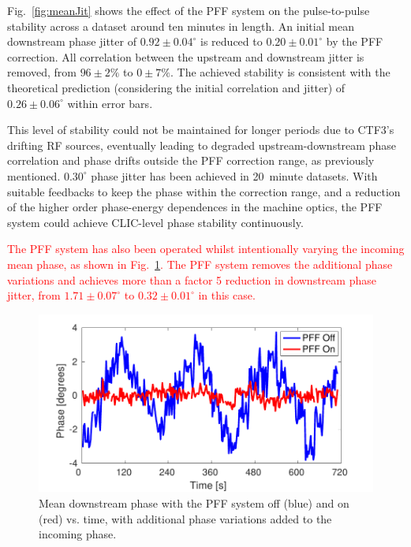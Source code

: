 \documentclass[%
 reprint,
superscriptaddress,
 amsmath,amssymb,
 prl,
]{revtex4-1}
\begin{document}
Fig.~\ref{fig:meanJit} shows the effect of the PFF system on the pulse-to-pulse 
stability across a dataset around ten minutes in length. An 
initial mean downstream phase jitter of \(0.92\pm0.04^\circ\) is reduced to \(0.20\pm0.01^\circ\) by the PFF 
correction. All correlation between the upstream and downstream jitter is removed, from 
\(96\pm2\%\) to \(0\pm7\%\). The achieved stability is consistent with the theoretical prediction (considering the initial correlation and jitter) of \(0.26\pm0.06^\circ\) within error bars.

This level of stability could not be maintained for longer periods due to 
CTF3's drifting RF sources, eventually leading to degraded 
upstream-downstream phase correlation and phase drifts outside the PFF 
correction range, as previously mentioned. \(0.30^\circ\) phase jitter has been 
achieved in 20~minute datasets. With suitable feedbacks to keep the phase 
within the correction range, and a reduction of the higher order phase-energy 
dependences in the machine optics, the PFF system could achieve CLIC-level 
phase stability continuously.

\textcolor{red}{The PFF system has also been operated 
whilst intentionally varying the incoming mean phase, as shown in 
Fig.~\ref{fig:wiggle}. The PFF system removes the additional phase variations 
and achieves more than a factor 5 reduction in downstream phase jitter, from 
\(1.71\pm0.07^\circ\) to \(0.32\pm0.01^\circ\) in this case.}

\begin{figure}
	\includegraphics[width=\columnwidth]{figs/wiggle}
	\caption{\label{fig:wiggle}Mean downstream phase with the PFF system off 
		(blue) and on (red) vs. time, with additional phase variations added to 
		the 
		incoming phase.}
\end{figure}
\end{document}
